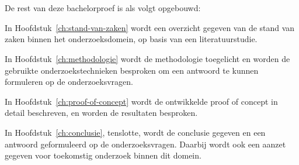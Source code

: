 \section{}%
\label{sec:opzet-bachelorproef}


De rest van deze bachelorproef is als volgt opgebouwd:

In Hoofdstuk~\ref{ch:stand-van-zaken} wordt een overzicht gegeven van de stand van zaken binnen het onderzoeksdomein, op basis van een literatuurstudie.

In Hoofdstuk~\ref{ch:methodologie} wordt de methodologie toegelicht en worden de gebruikte onderzoekstechnieken besproken om een antwoord te kunnen formuleren op de onderzoeksvragen.


In Hoofdstuk~\ref{ch:proof-of-concept} wordt de ontwikkelde proof of concept in detail beschreven, en worden de resultaten besproken.

In Hoofdstuk~\ref{ch:conclusie}, tenslotte, wordt de conclusie gegeven en een antwoord geformuleerd op de onderzoeksvragen. Daarbij wordt ook een aanzet gegeven voor toekomstig onderzoek binnen dit domein.